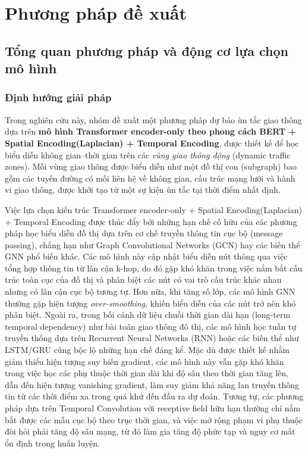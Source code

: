 \section{Phương pháp đề xuất}
\label{sec:method}

\subsection{Tổng quan phương pháp và động cơ lựa chọn mô hình}
\label{subsec:problem_overview}

\subsubsection{Định hướng giải pháp}
Trong nghiên cứu này, nhóm đề xuất một phương pháp dự báo ùn tắc giao thông dựa trên
\textbf{mô hình Transformer encoder-only theo phong cách BERT + Spatial Encoding(Laplacian) + Temporal Encoding}, được thiết kế để học biểu diễn
không gian--thời gian trên các \textit{vùng giao thông động} (dynamic traffic zones). Mỗi vùng giao thông được biểu diễn như một đồ thị con (subgraph) bao gồm các tuyến đường có mối liên hệ về không
gian, cấu trúc mạng lưới và hành vi giao thông, được khởi tạo từ một sự kiện ùn tắc tại thời điểm
nhất định.

Việc lựa chọn kiến trúc Transformer encoder-only + Spatial Encoding(Laplacian) + Temporal Encoding được thúc đẩy bởi những hạn chế cố hữu của các
phương pháp học biểu diễn đồ thị dựa trên cơ chế truyền thông tin cục bộ (message passing), chẳng
hạn như Graph Convolutional Networks (GCN) hay các biến thể GNN phổ biến khác. Các mô hình này
cập nhật biểu diễn nút thông qua việc tổng hợp thông tin từ lân cận k-hop, do đó gặp khó khăn trong
việc nắm bắt cấu trúc toàn cục của đồ thị và phân biệt các nút có vai trò cấu trúc khác nhau nhưng
có lân cận cục bộ tương tự. Hơn nữa, khi tăng số lớp, các mô hình GNN thường gặp hiện tượng
\textit{over-smoothing}, khiến biểu diễn của các nút trở nên khó phân biệt. Ngoài ra, trong bối cảnh dữ liệu chuỗi thời gian dài hạn (long-term temporal dependency) như bài toán giao thông đô thị, các mô hình học tuần tự truyền thống dựa trên Recurrent Neural Networks (RNN) hoặc các biến thể như LSTM/GRU cũng bộc lộ những hạn chế đáng kể. Mặc dù được thiết kế nhằm giảm thiểu hiện tượng suy biến gradient, các mô hình này vẫn gặp khó khăn trong việc học các phụ thuộc thời gian dài khi độ sâu theo thời gian tăng lên, dẫn đến hiện tượng vanishing gradient, làm suy giảm khả năng lan truyền thông tin từ các thời điểm xa trong quá khứ đến đầu ra dự đoán. Tương tự, các phương pháp dựa trên Temporal Convolution với receptive field hữu hạn thường chỉ nắm bắt được các mẫu cục bộ theo trục thời gian, và việc mở rộng phạm vi phụ thuộc đòi hỏi phải tăng độ sâu mạng, từ đó làm gia tăng độ phức tạp và nguy cơ mất ổn định trong huấn luyện.

